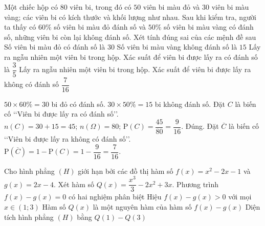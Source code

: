 \begin{ex}%
Một chiếc hộp có $80$ viên bi, trong đó có $50$ viên bi màu đỏ và $30$ viên bi màu vàng; các viên bi có kích thước và khối lượng như nhau. Sau khi kiểm tra, người ta thấy có $60\%$ số viên bi màu đỏ đánh số và $50\%$ số viên bi màu vàng có đánh số, những viên bi còn lại không đánh số. Xét tính đúng sai của các mệnh đề sau
\choiceTF
{\True Số viên bi màu đỏ có đánh số là $30$}
{\True Số viên bi màu vàng không đánh số là $15$}
{Lấy ra ngẫu nhiên một viên bi trong hộp. Xác suất để viên bi được lấy ra có đánh số là $\dfrac{3}{5}$}
{\True Lấy ra ngẫu nhiên một viên bi trong hộp. Xác suất để viên bi được lấy ra không có đánh số $\dfrac{7}{16}$}
\loigiai
{
\begin{itemchoice}
\itemch $50 \times 60\% = 30$ bi đỏ có đánh số.
\itemch $30 \times 50\% = 15$ bi không đánh số.
\itemch
Đặt $C$ là biến cố \lq\lq Viên bi được lấy ra có đánh số\rq\rq.\\
$n\left(C\right)=30+15= 45$; $n\left(\Omega\right)=80$; $\mathrm{P}(C) = \dfrac{45}{80} = \dfrac{9}{16}$.
\itemch Đúng. Đặt $\overline{C}$ là biến cố \lq\lq Viên bi được lấy ra không có đánh số\rq\rq.\\ $\mathrm{P}\left(\overline{C}\right) =1-\mathrm{P}\left(C\right) =1 - \dfrac{9}{16} = \dfrac{7}{16}$.
\end{itemchoice}
}
\end{ex}

\begin{ex}%
Cho hình phẳng $(H)$ giới hạn bởi các đồ thị hàm số $f(x)=x^2-2x-1$ và $g(x)=2x-4$. Xét hàm số $Q(x)=\dfrac{x^3}{3}-2x^2+3x$.
\choiceTF
{\True Phương trình $f(x)-g(x)=0$ có hai nghiệm phân biệt}
{Hiệu $f(x)-g(x) > 0$ với mọi $x \in(1; 3)$}
{\True Hàm số $Q(x)$ là một nguyên hàm của hàm số $f(x)-g(x)$}
{\True Diện tích hình phẳng $(H)$ bằng $Q(1)-Q(3)$}
\end{ex}

